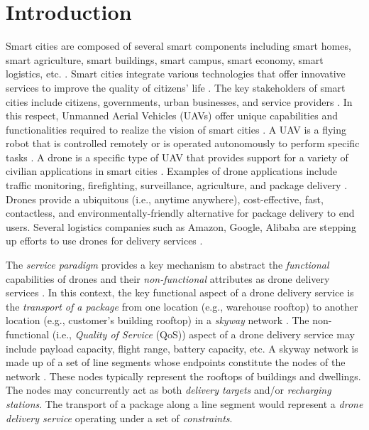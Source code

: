\documentclass[conference]{IEEEtran}
\begin{document}
\section{Introduction}
Smart cities are composed of several smart components including smart homes, smart agriculture, smart buildings, smart campus, smart economy, smart logistics, etc. \cite{9086495}. Smart cities integrate various technologies that offer innovative services to improve the quality of citizens' life \cite{Mishra2020}. The key stakeholders of smart cities include citizens, governments, urban businesses, and service providers \cite{jayasena2019stakeholder}. In this respect, Unmanned Aerial Vehicles (UAVs) offer unique capabilities and functionalities required to realize the vision of smart cities \cite{MOHAMED2020119293}. A UAV is a flying robot that is controlled remotely or is operated autonomously to perform specific tasks \cite{valavanis2015handbook}. A drone is a specific type of UAV that provides support for a variety of civilian applications in smart cities \cite{DBLP:journals/corr/abs-1805-00881}. Examples of drone applications include traffic monitoring, firefighting, surveillance, agriculture, and package delivery \cite{2}. Drones provide a ubiquitous (i.e., anytime anywhere), cost-effective, fast, contactless, and environmentally-friendly alternative for package delivery to end users. Several logistics companies such as Amazon, Google, Alibaba are stepping up efforts to use drones for delivery services \cite{Aurambout2019}.

The \textit{service paradigm} provides a key mechanism to abstract the \textit{functional} capabilities of drones and their \textit{non-functional} attributes as drone delivery services \cite{Bouguettaya:2017:SCM:3069398.2983528,shahzaad2019composing}. In this context, the key functional aspect of a drone delivery service is the {\em transport of a package} from one location (e.g., warehouse rooftop) to another location (e.g., customer's building rooftop) in a {\em skyway} network \cite{10.1145/3460418.3479289}. The non-functional (i.e., \textit{Quality of Service} (QoS)) aspect of a drone delivery service may include payload capacity, flight range, battery capacity, etc. A skyway network is made up of a set of line segments whose endpoints constitute the nodes of the network \cite{9284115}. These nodes typically represent the rooftops of buildings and dwellings. The nodes may concurrently act as both \textit{delivery targets} and/or \textit{recharging stations}. The transport of a package along a line segment would represent a \textit{drone delivery service} operating under a set of {\em constraints}.
\end{document}
